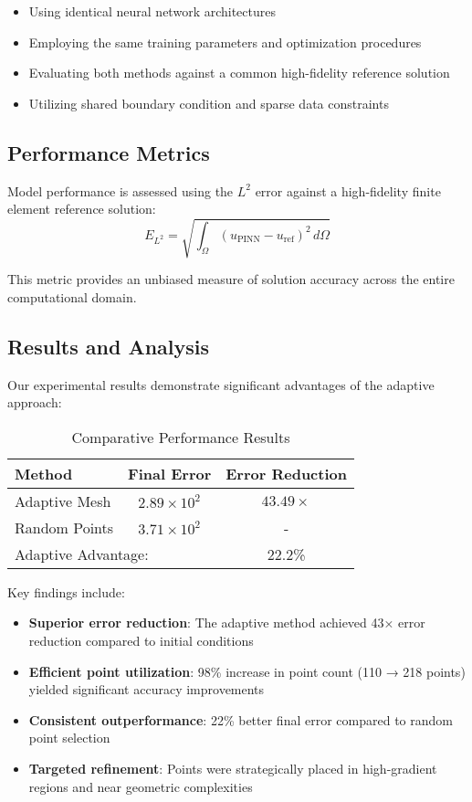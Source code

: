 \documentclass[11pt,a4paper]{article}
\begin{document}
\begin{itemize}
    \item Using identical neural network architectures
    \item Employing the same training parameters and optimization procedures
    \item Evaluating both methods against a common high-fidelity reference solution
    \item Utilizing shared boundary condition and sparse data constraints
\end{itemize}

\subsection{Performance Metrics}

Model performance is assessed using the $L^2$ error against a high-fidelity finite element reference solution:
\begin{equation}
E_{L^2} = \sqrt{\int_\Omega (u_{\text{PINN}} - u_{\text{ref}})^2 \, d\Omega}
\end{equation}

This metric provides an unbiased measure of solution accuracy across the entire computational domain.

\subsection{Results and Analysis}

Our experimental results demonstrate significant advantages of the adaptive approach:

\begin{table}[H]
\centering
\caption{Comparative Performance Results}
\begin{tabular}{lcc}
\toprule
Method & Final Error & Error Reduction \\
\midrule
Adaptive Mesh & $2.89 \times 10^2$ & $43.49\times$ \\
Random Points & $3.71 \times 10^2$ & - \\
\midrule
\multicolumn{2}{l}{Adaptive Advantage:} & 22.2\% \\
\bottomrule
\end{tabular}
\end{table}

Key findings include:

\begin{itemize}
    \item \textbf{Superior error reduction}: The adaptive method achieved 43× error reduction compared to initial conditions
    \item \textbf{Efficient point utilization}: 98\% increase in point count (110 → 218 points) yielded significant accuracy improvements
    \item \textbf{Consistent outperformance}: 22\% better final error compared to random point selection
    \item \textbf{Targeted refinement}: Points were strategically placed in high-gradient regions and near geometric complexities
\end{itemize}
\end{document}
